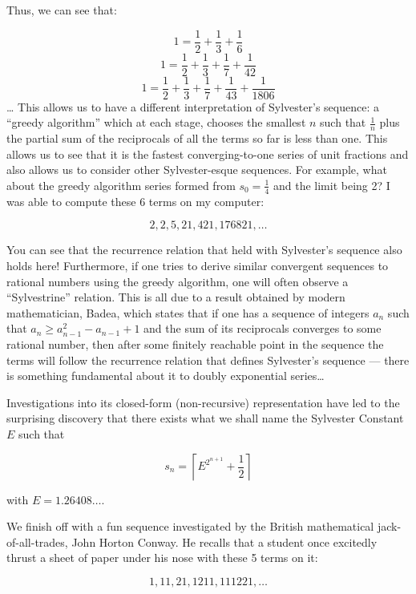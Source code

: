 Thus, we can see that:\par

\[ 1 = \frac{1}{2}+\frac{1}{3}+\frac{1}{6}\]
\[ 1 = \frac{1}{2}+\frac{1}{3}+\frac{1}{7}+\frac{1}{42}\]
\[ 1 = \frac{1}{2}+\frac{1}{3}+\frac{1}{7}+\frac{1}{43}+\frac{1}{1806}\]
…
This allows us to have a different interpretation of Sylvester’s sequence: a “greedy algorithm” which at each stage, chooses the smallest \(n\) such that \(\frac{1}{n}\) plus the partial sum of the reciprocals of all the terms so far is less than one. This allows us to see that it is the fastest converging-to-one series of unit fractions and also allows us to consider other Sylvester-esque sequences. For example, what about the greedy algorithm series formed from \(s_0 = \frac{1}{4}\) and the limit being 2? I was able to compute these 6 terms on my computer:\par

\[2, 2, 5, 21, 421, 176821, \ldots\]

You can see that the recurrence relation that held with Sylvester’s sequence also holds here! Furthermore, if one tries to derive similar convergent sequences to rational numbers using the greedy algorithm, one will often observe a “Sylvestrine” relation. This is all due to a result obtained by modern mathematician, Badea, which states that if one has a sequence of integers \(a_n\) such that \(a_n \geq a_{n-1}^2-a_{n-1}+1\) and the sum of its reciprocals converges to some rational number, then after some finitely reachable point in the sequence the terms will follow the recurrence relation that defines Sylvester’s sequence --- there is something fundamental about it to doubly exponential series…\par
Investigations into its closed-form (non-recursive) representation have led to the surprising discovery that there exists what we shall name the Sylvester Constant \(E\) such that\par

\[s_n = \left \lceil{E^{2^{n+1}}+\frac{1}{2}}\right \rceil\]

with \(E = 1.26408\ldots\).

\triast

We finish off with a fun sequence investigated by the British mathematical jack-of-all-trades, John Horton Conway. He recalls that a student once excitedly thrust a sheet of paper under his nose with these 5 terms on it:\par

\[1, 11, 21, 1211, 111221, \ldots\]

